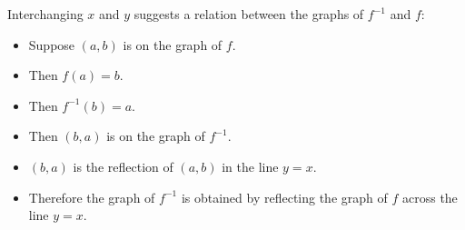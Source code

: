 \begin{frame}
\footnotesize 
Interchanging $x$ and $y$ suggests a relation between the graphs of $f^{-1}$ and $f$:
\begin{itemize}
\item<2->  Suppose $(a,b)$ is on the graph of $f$.
\item<3->  Then $f(a) = b$.
\item<4->  Then $f^{-1}(b) = a$.
\item<5->  Then $(b,a)$ is on the graph of $f^{-1}$.
\item<6->  $(b,a)$ is the reflection of $(a,b)$ in the line $y = x$.
\item<7->  Therefore the graph of $f^{-1}$ is obtained by reflecting the graph of $f$ across the line $y = x$.
\end{itemize}
\end{frame}
